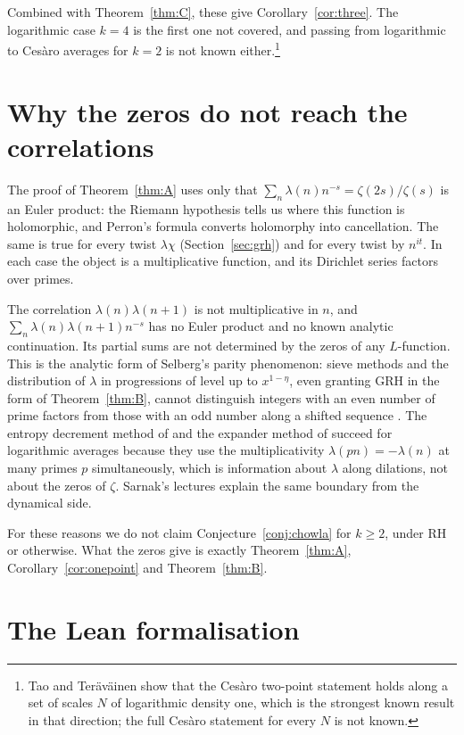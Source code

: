 \documentclass[11pt]{amsart}
\numberwithin{equation}{section}
\theoremstyle{plain}
\theoremstyle{definition}
\theoremstyle{remark}
\begin{document}
Combined with Theorem~\ref{thm:C}, these give Corollary~\ref{cor:three}. The logarithmic case $k=4$ is the first one not covered, and passing from logarithmic to Cesàro averages for $k=2$ is not known either.\footnote{Tao and Teräväinen \cite{TT19} show that the Cesàro two-point statement holds along a set of scales $N$ of logarithmic density one, which is the strongest known result in that direction; the full Cesàro statement for every $N$ is not known.}

\section{Why the zeros do not reach the correlations}\label{sec:parity}

The proof of Theorem~\ref{thm:A} uses only that $\sum_n\lambda(n)n^{-s}=\zeta(2s)/\zeta(s)$ is an Euler product: the Riemann hypothesis tells us where this function is holomorphic, and Perron's formula converts holomorphy into cancellation. The same is true for every twist $\lambda\chi$ (Section~\ref{sec:grh}) and for every twist by $n^{it}$. In each case the object is a multiplicative function, and its Dirichlet series factors over primes.

The correlation $\lambda(n)\lambda(n+1)$ is not multiplicative in $n$, and $\sum_n\lambda(n)\lambda(n+1)n^{-s}$ has no Euler product and no known analytic continuation. Its partial sums are not determined by the zeros of any $L$-function. This is the analytic form of Selberg's parity phenomenon: sieve methods and the distribution of $\lambda$ in progressions of level up to $x^{1-\eta}$, even granting GRH in the form of Theorem~\ref{thm:B}, cannot distinguish integers with an even number of prime factors from those with an odd number along a shifted sequence \cite{FI10}. The entropy decrement method of \cite{Tao16} and the expander method of \cite{HR21} succeed for logarithmic averages because they use the multiplicativity $\lambda(pn)=-\lambda(n)$ at many primes $p$ simultaneously, which is information about $\lambda$ along dilations, not about the zeros of $\zeta$. Sarnak's lectures \cite{Sar11} explain the same boundary from the dynamical side.

For these reasons we do not claim Conjecture~\ref{conj:chowla} for $k\ge2$, under RH or otherwise. What the zeros give is exactly Theorem~\ref{thm:A}, Corollary~\ref{cor:onepoint} and Theorem~\ref{thm:B}.

\section{The Lean formalisation}\label{sec:lean}
\end{document}
